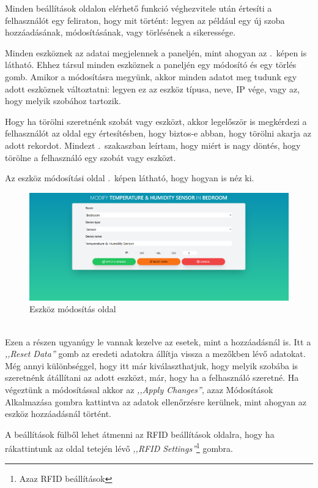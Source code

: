 \documentclass[
]{thesis-ekf}
\theoremstyle{definition}
\theoremstyle{remark}
\begin{document}
	Minden beállítások oldalon elérhető funkció véghezvitele után értesíti a felhasználót egy feliraton, hogy mit történt: legyen az például egy új szoba hozzáadásának, módosításának, vagy törlésének a sikeressége.
	
	Minden eszköznek az adatai megjelennek a paneljén, mint ahogyan az .~képen is látható. Ehhez társul minden eszköznek a paneljén egy módosító és egy törlés gomb. Amikor a módosításra megyünk, akkor minden adatot meg tudunk egy adott eszköznek változtatni: legyen ez az eszköz típusa, neve, IP vége, vagy az, hogy melyik szobához tartozik.
	
	Hogy ha törölni szeretnénk szobát vagy eszközt, akkor legelőször is megkérdezi a felhasználót az oldal egy értesítésben, hogy biztos-e abban, hogy törölni akarja az adott rekordot. Mindezt .~szakaszban leírtam, hogy miért is nagy döntés, hogy törölne a felhasználó egy szobát vagy eszközt.
	
	Az eszköz módosítási oldal .~képen látható, hogy hogyan is néz ki.
	\begin{figure}[ht!]
		\centering
		\includegraphics[width=1\textwidth]{./src/pages_img/modify-sensor-in-bedroom}
		\caption{Eszköz módosítás oldal}
		\label{modify}
	\end{figure}\\
	Ezen a részen ugyanúgy le vannak kezelve az esetek, mint a hozzáadásnál is. Itt a \emph{,,Reset Data''} gomb az eredeti adatokra állítja vissza a mezőkben lévő adatokat. Még annyi különbséggel, hogy itt már kiválaszthatjuk, hogy melyik szobába is szeretnénk átállítani az adott eszközt, már, hogy ha a felhasználó szeretné. Ha végeztünk a módosítással akkor az \emph{,,Apply Changes''}, azaz Módosítások Alkalmazása gombra kattintva az adatok ellenőrzésre kerülnek, mint ahogyan az eszköz hozzáadásnál történt.
	
	A beállítások fülből lehet átmenni az RFID beállítások oldalra, hogy ha rákattintunk az oldal tetején lévő \emph{,,RFID Settings''}\footnote{Azaz RFID beállítások} gombra.
	
\end{document}
